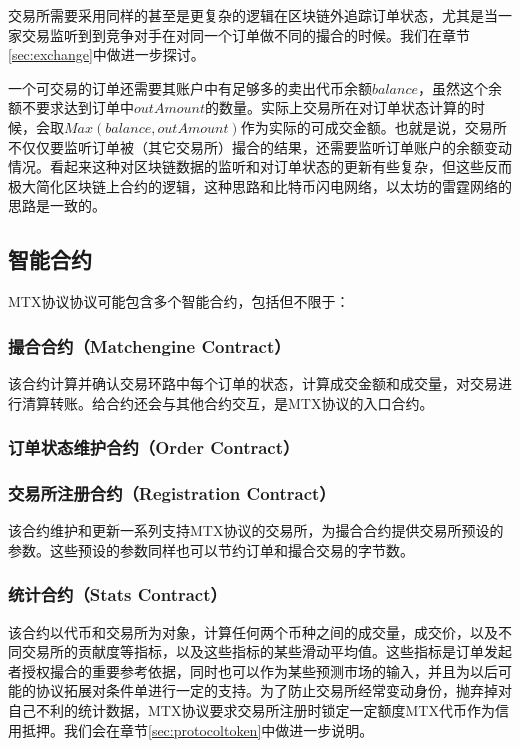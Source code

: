 \documentclass[UTF8,nofonts]{ctexart}
\begin{document}
交易所需要采用同样的甚至是更复杂的逻辑在区块链外追踪订单状态，尤其是当一家交易监听到到竞争对手在对同一个订单做不同的撮合的时候。我们在章节\ref{sec:exchange}中做进一步探讨。

一个可交易的订单还需要其账户中有足够多的卖出代币余额$balance$，虽然这个余额不要求达到订单中$outAmount$的数量。实际上交易所在对订单状态计算的时候，会取$Max(balance, outAmount)$作为实际的可成交金额。也就是说，交易所不仅仅要监听订单被（其它交易所）撮合的结果，还需要监听订单账户的余额变动情况。看起来这种对区块链数据的监听和对订单状态的更新有些复杂，但这些反而极大简化区块链上合约的逻辑，这种思路和比特币闪电网络，以太坊的雷霆网络的思路是一致的。


\subsection{智能合约\label{sec:contracts}}

MTX协议协议可能包含多个智能合约，包括但不限于：

\subsubsection{撮合合约（Matchengine Contract）} 

该合约计算并确认交易环路中每个订单的状态，计算成交金额和成交量，对交易进行清算转账。给合约还会与其他合约交互，是MTX协议的入口合约。

\subsubsection{订单状态维护合约（Order Contract）}

\subsubsection{交易所注册合约（Registration Contract）}
该合约维护和更新一系列支持MTX协议的交易所，为撮合合约提供交易所预设的参数。这些预设的参数同样也可以节约订单和撮合交易的字节数。

\subsubsection{统计合约（Stats Contract）} 该合约以代币和交易所为对象，计算任何两个币种之间的成交量，成交价，以及不同交易所的贡献度等指标，以及这些指标的某些滑动平均值。这些指标是订单发起者授权撮合的重要参考依据，同时也可以作为某些预测市场的输入，并且为以后可能的协议拓展对条件单进行一定的支持。为了防止交易所经常变动身份，抛弃掉对自己不利的统计数据，MTX协议要求交易所注册时锁定一定额度MTX代币作为信用抵押。我们会在章节\ref{sec:protocoltoken}中做进一步说明。
\end{document}
